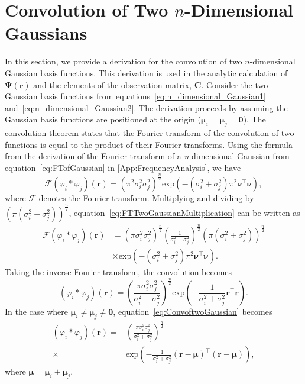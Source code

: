 \documentclass[review,authoryear,3p]{elsarticle}
\begin{document}
\section{Convolution of Two $n$-Dimensional Gaussians}\label{ap:ConvOfGaussians}
In this section, we provide a derivation for the convolution of two $n$-dimensional Gaussian basis functions. This derivation is used in the analytic calculation of $\boldsymbol\Psi(\mathbf{r})$ and the elements of the observation matrix, $\mathbf C$. Consider the two Gaussian basis functions from equations~\ref{eq:n_dimensional_Gaussian1} and~\ref{eq:n_dimensional_Gaussian2}. The derivation proceeds by assuming the Gaussian basis functions are positioned at the origin ($\boldsymbol\mu_i=\boldsymbol\mu_j=\mathbf 0$). The convolution theorem states that the Fourier transform of the convolution of two functions is equal to the product of their Fourier transforms. Using the formula from the derivation of the Fourier transform of a \emph{n}-dimensional Gaussian from equation~\ref{eq:FTofGaussian} in \ref{App:FrequencyAnalysis}, we have
\begin{equation}\label{eq:FTTwoGaussianMultiplication}
\mathcal{F}\left(\varphi_i*\varphi_j\right)(\mathbf{r}) = \left(\pi^2\sigma_i^2\sigma_j^2\right)^{\frac{n}{2}}\mathrm{exp}\left(-(\sigma_i^2+\sigma_j^2)\pi^2\boldsymbol\nu^\top\boldsymbol\nu\right),
\end{equation}
where $\mathcal{F}$ denotes the Fourier transform. Multiplying and dividing by $\left(\pi\left(\sigma_i^2+\sigma_j^2\right)\right)^{\frac{n}{2}}$, equation~\ref{eq:FTTwoGaussianMultiplication} can be written as 
\begin{align}
\mathcal{F}\left(\varphi_i*\varphi_j\right)(\mathbf{r})&=\left(\pi\sigma_i^2\sigma_j^2\right)^{\frac{n}{2}}\left(\frac{1}{\sigma_i^2+\sigma_j^2}\right)^{\frac{n}{2}} (\pi(\sigma_i^2+\sigma_j^2))^{\frac{n}{2}} \nonumber \\
 &\times\mathrm{exp}\left(-(\sigma_i^2+\sigma_j^2)\pi^2\boldsymbol\nu^\top\boldsymbol\nu\right).
\end{align}
Taking the inverse Fourier transform, the convolution becomes
\begin{equation}\label{eq:ConvoftwoGaussian}
 \left(\varphi_i*\varphi_j\right)(\mathbf{r}) = \left(\frac{\pi\sigma_i^2\sigma_j^2}{\sigma_i^2+\sigma_j^2}\right)^{\frac{n}{2}}\mathrm{exp}\left({-\frac{1}{\sigma_i^2+\sigma_j^2} \mathbf r^\top\mathbf r}\right).
\end{equation}
In the case where $\boldsymbol\mu_i\neq\boldsymbol\mu_j\neq\mathbf 0$, equation~\ref{eq:ConvoftwoGaussian} becomes
\begin{align}\label{eq:ConvoftwoGaussianNonzeroMean}
 \left(\varphi_i*\varphi_j\right)(\mathbf{r}) =& \left( \frac{\pi\sigma_i^2\sigma_j^2} {\sigma_i^2+\sigma_j^2}\right)^{\frac{n}{2}}\nonumber \\
\times & \mathrm{exp}\left({-\frac{1}{\sigma_i^2+\sigma_j^2} (\mathbf r-\boldsymbol\mu)^\top(\mathbf r-\boldsymbol\mu)}\right),
\end{align}
where $\boldsymbol\mu=\boldsymbol\mu_i+\boldsymbol\mu_j$.
\end{document}
